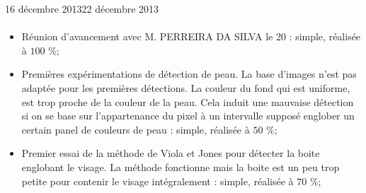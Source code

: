 \documentclass[11pt, french,screen]{report-rd-info}
\begin{document}
\begin{fichesuivi}{16 décembre 2013}{22 décembre 2013}
\paragraph{}
	\begin{travaileffectue}
		\begin{itemize}
			\item Réunion d'avancement avec M. PERREIRA DA SILVA le 20 : simple, réalisée à $100$ \%;
			\item Premières expérimentations de détection de peau. La base d'images n'est pas adaptée pour les premières détections. La couleur du fond qui est uniforme, est trop proche de la couleur de la peau. Cela induit une mauvaise détection si on se base sur l'appartenance du pixel à un intervalle supposé englober un certain panel de couleurs de peau : simple, réalisée à $50$ \%;
			\item Premier essai de la méthode de Viola et Jones pour détecter la boite englobant le visage. La méthode fonctionne mais la boite est un peu trop petite pour contenir le visage intégralement : simple, réalisée à $70$ \%;
		\end{itemize}
	\end{travaileffectue}


\end{fichesuivi}
\end{document}
